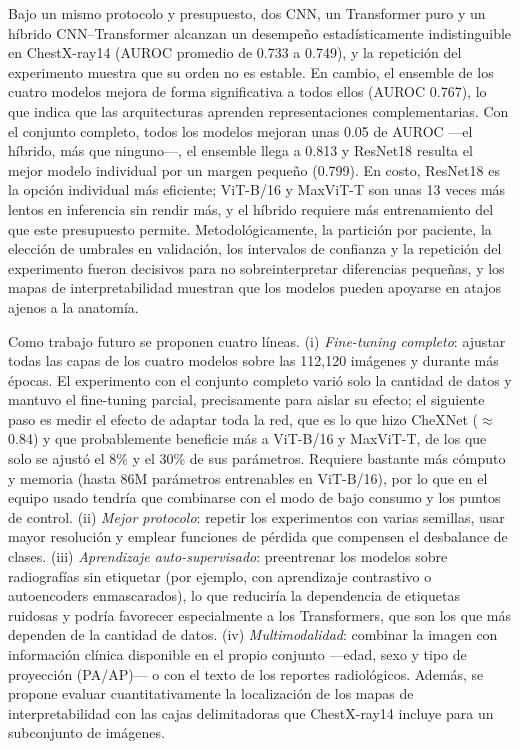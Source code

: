\documentclass[conference]{IEEEtran}
\begin{document}
Bajo un mismo protocolo y presupuesto, dos CNN, un Transformer puro y un híbrido CNN--Transformer alcanzan un desempeño estadísticamente indistinguible en ChestX-ray14 (AUROC promedio de 0.733 a 0.749), y la repetición del experimento muestra que su orden no es estable. En cambio, el ensemble de los cuatro modelos mejora de forma significativa a todos ellos (AUROC 0.767), lo que indica que las arquitecturas aprenden representaciones complementarias. Con el conjunto completo, todos los modelos mejoran unas 0.05 de AUROC ---el híbrido, más que ninguno---, el ensemble llega a 0.813 y ResNet18 resulta el mejor modelo individual por un margen pequeño (0.799). En costo, ResNet18 es la opción individual más eficiente; ViT-B/16 y MaxViT-T son unas 13 veces más lentos en inferencia sin rendir más, y el híbrido requiere más entrenamiento del que este presupuesto permite. Metodológicamente, la partición por paciente, la elección de umbrales en validación, los intervalos de confianza y la repetición del experimento fueron decisivos para no sobreinterpretar diferencias pequeñas, y los mapas de interpretabilidad muestran que los modelos pueden apoyarse en atajos ajenos a la anatomía.

Como trabajo futuro se proponen cuatro líneas. (i) \emph{Fine-tuning completo}: ajustar todas las capas de los cuatro modelos sobre las 112{,}120 imágenes y durante más épocas. El experimento con el conjunto completo varió solo la cantidad de datos y mantuvo el fine-tuning parcial, precisamente para aislar su efecto; el siguiente paso es medir el efecto de adaptar toda la red, que es lo que hizo CheXNet ($\approx$0.84) y que probablemente beneficie más a ViT-B/16 y MaxViT-T, de los que solo se ajustó el 8\% y el 30\% de sus parámetros. Requiere bastante más cómputo y memoria (hasta 86M parámetros entrenables en ViT-B/16), por lo que en el equipo usado tendría que combinarse con el modo de bajo consumo y los puntos de control. (ii) \emph{Mejor protocolo}: repetir los experimentos con varias semillas, usar mayor resolución y emplear funciones de pérdida que compensen el desbalance de clases. (iii) \emph{Aprendizaje auto-supervisado}: preentrenar los modelos sobre radiografías sin etiquetar (por ejemplo, con aprendizaje contrastivo o autoencoders enmascarados), lo que reduciría la dependencia de etiquetas ruidosas y podría favorecer especialmente a los Transformers, que son los que más dependen de la cantidad de datos. (iv) \emph{Multimodalidad}: combinar la imagen con información clínica disponible en el propio conjunto ---edad, sexo y tipo de proyección (PA/AP)--- o con el texto de los reportes radiológicos. Además, se propone evaluar cuantitativamente la localización de los mapas de interpretabilidad con las cajas delimitadoras que ChestX-ray14 incluye para un subconjunto de imágenes.
\end{document}
